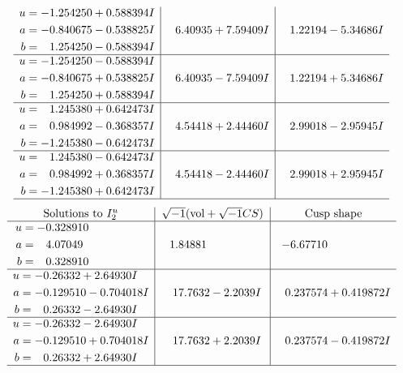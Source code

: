 \documentclass[1p]{elsarticle_modified}
\theoremstyle{definition}
\newcommand{\I}{\sqrt{-1}}
\begin{document}
$$\begin{array}{c|c|c}
\begin{aligned}
u &= -1.254250 + 0.588394 I \\
a &= -0.840675 - 0.538825 I \\
b &= \phantom{-}1.254250 - 0.588394 I\end{aligned}
 & \phantom{-}6.40935 + 7.59409 I & \phantom{-}1.22194 - 5.34686 I \\ \hline\begin{aligned}
u &= -1.254250 - 0.588394 I \\
a &= -0.840675 + 0.538825 I \\
b &= \phantom{-}1.254250 + 0.588394 I\end{aligned}
 & \phantom{-}6.40935 - 7.59409 I & \phantom{-}1.22194 + 5.34686 I \\ \hline\begin{aligned}
u &= \phantom{-}1.245380 + 0.642473 I \\
a &= \phantom{-}0.984992 - 0.368357 I \\
b &= -1.245380 - 0.642473 I\end{aligned}
 & \phantom{-}4.54418 + 2.44460 I & \phantom{-}2.99018 - 2.95945 I \\ \hline\begin{aligned}
u &= \phantom{-}1.245380 - 0.642473 I \\
a &= \phantom{-}0.984992 + 0.368357 I \\
b &= -1.245380 + 0.642473 I\end{aligned}
 & \phantom{-}4.54418 - 2.44460 I & \phantom{-}2.99018 + 2.95945 I\\
 \hline 
 \end{array}$$\newpage$$\begin{array}{c|c|c}  
\text{Solutions to }I^u_{2}& \I (\text{vol} + \sqrt{-1}CS) & \text{Cusp shape}\\
 \hline 
\begin{aligned}
u &= -0.328910\phantom{ +0.000000I} \\
a &= \phantom{-}4.07049\phantom{ +0.000000I} \\
b &= \phantom{-}0.328910\phantom{ +0.000000I}\end{aligned}
 & \phantom{-}1.84881\phantom{ +0.000000I} & -6.67710\phantom{ +0.000000I} \\ \hline\begin{aligned}
u &= -0.26332 + 2.64930 I \\
a &= -0.129510 - 0.704018 I \\
b &= \phantom{-}0.26332 - 2.64930 I\end{aligned}
 & \phantom{-}17.7632 - 2.2039 I & \phantom{-}0.237574 + 0.419872 I \\ \hline\begin{aligned}
u &= -0.26332 - 2.64930 I \\
a &= -0.129510 + 0.704018 I \\
b &= \phantom{-}0.26332 + 2.64930 I\end{aligned}
 & \phantom{-}17.7632 + 2.2039 I & \phantom{-}0.237574 - 0.419872 I\\
 \hline 
 \end{array}$$\newpage\newpage\renewcommand{\arraystretch}{1}
\end{document}
